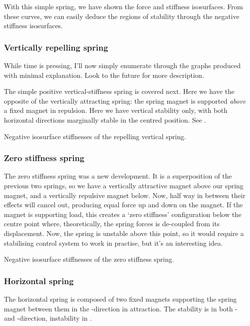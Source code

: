 \documentclass[11pt,a4paper]{memoir}
\begin{document}
With this simple spring, we have shown the force and stiffness isosurfaces.
From these curves, we can easily deduce the regions of stability through the
negative stiffness isosurfaces.

\subsubsection{Vertically repelling spring}

While time is pressing, I'll now simply enumerate through the graphs produced
with minimal explanation. Look to the future for more description.

The simple positive vertical-stiffness spring is covered next. Here we have
the opposite of the vertically attracting spring: the spring magnet is
supported \emph{above} a fixed magnet in repulsion. Here we have vertical
stability only, with both horizontal directions marginally stable in the
centred position. See .

  {Negative isosurface stiffnesses of the repelling vertical spring.}

\subsubsection{Zero stiffness spring}

The zero stiffness spring was a new development. It is a superposition of the
previous two springs, so we have a vertically attractive magnet above our
spring magnet, and a vertically repulsive magnet below. Now, half way in
between their effects will cancel out, producing equal force up and down on
the magnet. If the magnet is supporting load, this creates a `zero stiffness'
configuration below the centre point where, theoretically, the spring forces
is de-coupled from its displacement. Now, the spring is unstable above this
point, so it would require a stabilising control system to work in practise,
but it's an interesting idea.

  {Negative isosurface stiffnesses of the zero stiffness spring.}

\subsubsection{Horizontal spring}

The horizontal spring is composed of two fixed magnets supporting the spring
magnet between them in the \x-direction in attraction. The stability is in
both \y- and \z-direction, instability in \x.
\end{document}
